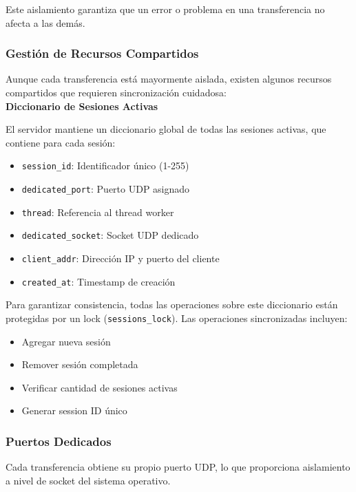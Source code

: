 Este aislamiento garantiza que un error o problema en una transferencia no afecta a las demás.

\subsubsection{Gestión de Recursos Compartidos}

Aunque cada transferencia está mayormente aislada, existen algunos recursos compartidos que requieren sincronización cuidadosa:
\\

\textbf{Diccionario de Sesiones Activas}

El servidor mantiene un diccionario global de todas las sesiones activas, que contiene para cada sesión:

\begin{itemize}
    \item \texttt{session\_id}: Identificador único (1-255)
    \item \texttt{dedicated\_port}: Puerto UDP asignado
    \item \texttt{thread}: Referencia al thread worker
    \item \texttt{dedicated\_socket}: Socket UDP dedicado
    \item \texttt{client\_addr}: Dirección IP y puerto del cliente
    \item \texttt{created\_at}: Timestamp de creación
\end{itemize}

Para garantizar consistencia, todas las operaciones sobre este diccionario están protegidas por un lock (\texttt{sessions\_lock}). Las operaciones sincronizadas incluyen:

\begin{itemize}
    \item Agregar nueva sesión
    \item Remover sesión completada
    \item Verificar cantidad de sesiones activas
    \item Generar session ID único
\end{itemize}

\subsubsection{Puertos Dedicados}

Cada transferencia obtiene su propio puerto UDP, lo que proporciona aislamiento a nivel de socket del sistema operativo.


